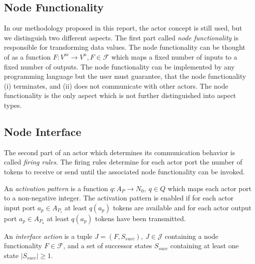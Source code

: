 \subsection{Node Functionality}\label{node-functionality}

In our methodology proposed in this report, the actor concept is still used,
but we distinguish two different aspects.
The first part called \emph{node functionality} is responsible
for transforming data values. The node functionality can be
thought of as a function $F: V^{m} \to V^{n}, F \in \mathcal{F}$  which maps a fixed
number of inputs to a fixed number of outputs. The node functionality
can be implemented by any programming language but
the user must guarantee, that the node functionality (i) terminates,
and (ii) does not communicate with other actors.
The node functionality is the only aspect which is not
further distinguished into aspect types.

\subsection{Node Interface}\label{node-interface}

The second part of an actor which determines its communication
behavior is called \emph{firing rules}. The firing rules
determine for each actor port the number of tokens to receive or send
until the associated node functionality can be invoked.


\begin{definition}\label{activation-pattern}
An \emph{activation pattern} is a function $q: A_{P} \to N_0,\ q \in Q$
which maps each actor port to a non-negative integer.
The activation pattern is enabled if for each actor input port
$a_{p} \in A_{P_{i}}$ at least $q(a_{p})$ tokens are available
and for each actor output port
$a_{p} \in A_{P_{o}}$ at least $q(a_{p})$ tokens have been
transmitted.
\end{definition}

\begin{definition}\label{interface-action}
An \emph{interface action} is a tuple $J = (F,S_{succ}),\ J \in \mathcal{J}$ containing
a node functionality $F \in \mathcal{F}$, and a set of successor states $S_{succ}$ containing at least
one state $|S_{succ}| \ge 1$.
\end{definition}

